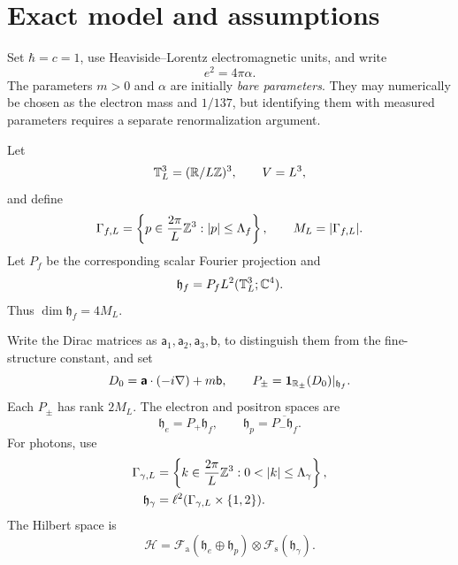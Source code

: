 \section{Exact model and assumptions}
\label{sec:model}

Set \(\hbar=c=1\), use Heaviside--Lorentz electromagnetic units, and write
\begin{equation}
e^2=4\pi\alpha.
\end{equation}
The parameters \(m>0\) and \(\alpha\) are initially \emph{bare parameters}.
They may numerically be chosen as the electron mass and \(1/137\), but identifying
them with measured parameters requires a separate renormalization argument.

Let
\begin{equation}
\mathbb T_L^3=(\mathbb R/L\mathbb Z)^3,\qquad V=L^3,
\end{equation}
and define
\begin{equation}
\Gamma_{f,L}=\left\{p\in\frac{2\pi}{L}\mathbb Z^3:|p|\le\Lambda_f\right\},
\qquad M_L=|\Gamma_{f,L}|.
\end{equation}
Let \(P_f\) be the corresponding scalar Fourier projection and
\begin{equation}
\mathfrak h_f=P_fL^2(\mathbb T_L^3;\mathbb C^4).
\end{equation}
Thus \(\dim\mathfrak h_f=4M_L\).

Write the Dirac matrices as \(\mathsf a_1,\mathsf a_2,\mathsf a_3,\mathsf b\),
to distinguish them from the fine-structure constant, and set
\begin{equation}
D_0=\boldsymbol{\mathsf a}\cdot(-i\nabla)+m\mathsf b,\qquad
P_\pm=\mathbf1_{\mathbb R_\pm}(D_0)|_{\mathfrak h_f}.
\end{equation}
Each \(P_\pm\) has rank \(2M_L\). The electron and positron spaces are
\begin{equation}
\mathfrak h_e=P_+\mathfrak h_f,\qquad
\mathfrak h_p=\overline{P_-\mathfrak h_f}.
\end{equation}
For photons, use
\begin{equation}
\begin{split}
\Gamma_{\gamma,L}
&=\left\{k\in\frac{2\pi}{L}\Z^3:0<|k|\le\Lambda_\gamma\right\},\\
\mathfrak h_\gamma&=\ell^2(\Gamma_{\gamma,L}\times\{1,2\}).
\end{split}
\end{equation}
The Hilbert space is
\begin{equation}
\mathcal H=
\mathcal F_{\mathrm a}(\mathfrak h_e\oplus\mathfrak h_p)
\otimes\mathcal F_{\mathrm s}(\mathfrak h_\gamma).
\end{equation}

